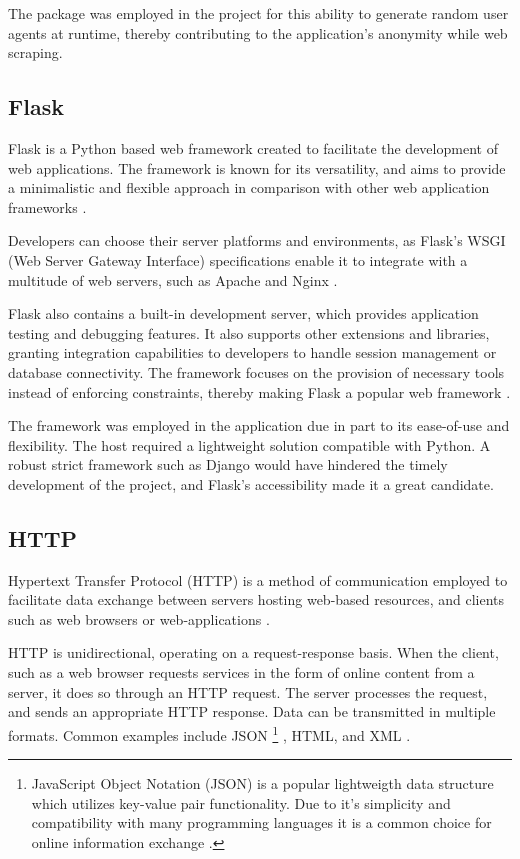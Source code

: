 \documentclass{thesis-ekf}
\theoremstyle{definition}
\theoremstyle{remark}
\begin{document}
{The package was employed in the project for this ability to generate random user agents at runtime, thereby contributing to the application's anonymity while web scraping.

\subsection{Flask}
Flask is a Python based web framework created to facilitate the development of web applications. The framework is known for its versatility, and aims to provide a minimalistic and flexible approach in comparison with other web application frameworks \cite{docs-flask}. 

Developers can choose their server platforms and environments, as Flask's WSGI (Web Server Gateway Interface) specifications enable it to integrate with a multitude of web servers, such as Apache and Nginx \cite{flask}.

Flask also contains a built-in development server, which provides application testing and debugging features. It also supports other extensions and libraries, granting integration capabilities to developers to handle session management or database connectivity. The framework focuses on the provision of necessary tools instead of enforcing constraints, thereby making Flask a popular web framework \cite{flask}.

The framework was employed in the application due in part to its ease-of-use and flexibility. The host required a lightweight solution compatible with Python. A robust strict framework such as Django would have hindered the timely development of the project, and Flask's accessibility made it a great candidate.   

\subsection{HTTP} \label{sub-http}
Hypertext Transfer Protocol (HTTP) is a method of communication employed to facilitate data exchange between servers hosting web-based resources, and clients such as web browsers or web-applications \cite{mdn-http}.

HTTP is unidirectional, operating on a request-response basis. When the client, such as a web browser requests services in the form of online content from a server, it does so through an HTTP request. The server processes the request, and sends an appropriate HTTP response. Data can be transmitted in multiple formats. Common examples include JSON 
 \footnote{JavaScript Object Notation (JSON) is a popular lightweigth data structure which utilizes key-value pair functionality. Due to it's simplicity and compatibility with many programming languages it is a common choice for online information exchange \cite{mdn-json}.}
, HTML, and XML \cite{wiki-http}.

}
\end{document}
